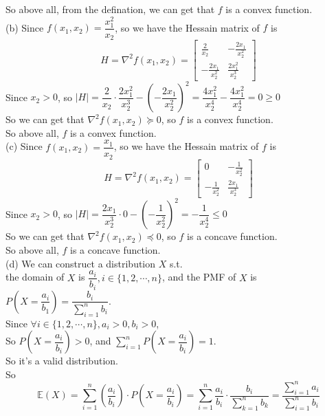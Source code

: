\documentclass[10pt]{article}
\begin{document}
\begin{enumerate}[1.]
		  So above all, from the defination, we can get that $f$ is a convex function.\\

		  (b) Since $f(x_1,x_2)=\dfrac{x_1^2}{x_2}$, so we have the Hessain matrix of $f$ is
		  $$H=\nabla^2f(x_1,x_2)=
		  \begin{bmatrix}
		  \frac{2}{x_2} & -\frac{2x_1}{x_2^2}\\
		  -\frac{2x_1}{x_2^2} & \frac{2x_1^2}{x_2^3}
	      \end{bmatrix}$$
		  Since $x_2 > 0$, so $|H|=\dfrac{2}{x_2}\cdot\dfrac{2x_1^2}{x_2^3}-(-\dfrac{2x_1}{x_2^2})^2=\dfrac{4x_1^2}{x_2^4}-\dfrac{4x_1^2}{x_2^4}=0\geq 0$\\
		  So we can get that $\nabla^2f(x_1,x_2)\succeq 0$, so $f$ is a convex function.\\

		  So above all, $f$ is a convex function.\\

		  (c) Since $f(x_1,x_2)=\dfrac{x_1}{x_2}$, so we have the Hessain matrix of $f$ is
		  $$H=\nabla^2f(x_1,x_2)=
		  \begin{bmatrix}
		  0 & -\frac{1}{x_2^2}\\
		  -\frac{1}{x_2^2} & \frac{2x_1}{x_2^3}
	      \end{bmatrix}$$
		  Since $x_2 > 0$, so $|H|=\dfrac{2x_1}{x_2^3}\cdot 0-(-\dfrac{1}{x_2^2})^2=-\dfrac{1}{x_2^4}\leq 0$\\
		  So we can get that $\nabla^2f(x_1,x_2)\preceq 0$, so $f$ is a concave function.\\

		  So above all, $f$ is a concave function.\\

		  (d) We can construct a distribution $X$ s.t.\\
		  the domain of $X$ is $\dfrac{a_i}{b_i}, i\in\{1,2,\cdots,n\}$, and the PMF of $X$ is $P(X=\dfrac{a_i}{b_1})=\dfrac{b_i}{\sum\limits_{i=1}^{n}b_i}$.\\
		  Since $\forall i \in\{1,2,\cdots,n\}, a_i > 0, b_i > 0$,\\
		  So $P(X=\dfrac{a_i}{b_i}) > 0$, and $\sum\limits_{i=1}^{n}P(X=\dfrac{a_i}{b_i})=1$.\\
		  So it's a valid distribution.\\
		  So $$\mathbb{E}(X)=\sum\limits_{i=1}^{n} (\dfrac{a_i}{b_i})\cdot P(X=\dfrac{a_i}{b_i})=\sum\limits_{i=1}^{n} \dfrac{a_i}{b_i}\cdot \dfrac{b_i}{\sum\limits_{k=1}^{n}b_k}=\dfrac{\sum\limits_{i=1}^{n}a_i}{\sum\limits_{i=1}^{n}b_i}$$


\end{enumerate}
\end{document}
